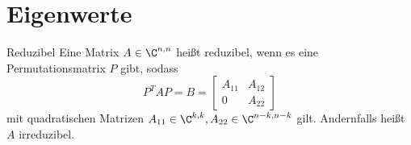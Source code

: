 \section{Eigenwerte}

\begin{karte}{Reduzibel}
    Eine Matrix \( A \in \C^{n,n} \) heißt reduzibel, wenn es eine Permutationsmatrix \(P\)
    gibt, sodass 
    \[ P^T A P = B = \left[ \begin{matrix} A_{11} & A_{12} \\ 0 & A_{22} \end{matrix} \right] \]
    mit quadratischen Matrizen \( A_{11} \in \C^{k,k}, A_{22} \in \C^{n-k,n-k} \) gilt. 
    Andernfalls heißt \( A \) irreduzibel.
\end{karte}